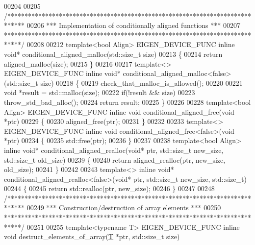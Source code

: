 \begin{DoxyCode}
00204 
00205 \textcolor{comment}{/*****************************************************************************}
00206 \textcolor{comment}{*** Implementation of conditionally aligned functions                      ***}
00207 \textcolor{comment}{*****************************************************************************/}
00208 
00212 \textcolor{keyword}{template}<\textcolor{keywordtype}{bool} Align> EIGEN\_DEVICE\_FUNC \textcolor{keyword}{inline} \textcolor{keywordtype}{void}* conditional\_aligned\_malloc(std::size\_t size)
00213 \{
00214   \textcolor{keywordflow}{return} aligned\_malloc(size);
00215 \}
00216 
00217 \textcolor{keyword}{template}<> EIGEN\_DEVICE\_FUNC \textcolor{keyword}{inline} \textcolor{keywordtype}{void}* conditional\_aligned\_malloc<false>(std::size\_t size)
00218 \{
00219   check\_that\_malloc\_is\_allowed();
00220 
00221   \textcolor{keywordtype}{void} *result = std::malloc(size);
00222   \textcolor{keywordflow}{if}(!result && size)
00223     throw\_std\_bad\_alloc();
00224   \textcolor{keywordflow}{return} result;
00225 \}
00226 
00228 \textcolor{keyword}{template}<\textcolor{keywordtype}{bool} Align> EIGEN\_DEVICE\_FUNC \textcolor{keyword}{inline} \textcolor{keywordtype}{void} conditional\_aligned\_free(\textcolor{keywordtype}{void} *ptr)
00229 \{
00230   aligned\_free(ptr);
00231 \}
00232 
00233 \textcolor{keyword}{template}<> EIGEN\_DEVICE\_FUNC \textcolor{keyword}{inline} \textcolor{keywordtype}{void} conditional\_aligned\_free<false>(\textcolor{keywordtype}{void} *ptr)
00234 \{
00235   std::free(ptr);
00236 \}
00237 
00238 \textcolor{keyword}{template}<\textcolor{keywordtype}{bool} Align> \textcolor{keyword}{inline} \textcolor{keywordtype}{void}* conditional\_aligned\_realloc(\textcolor{keywordtype}{void}* ptr, std::size\_t new\_size, std::size\_t 
      old\_size)
00239 \{
00240   \textcolor{keywordflow}{return} aligned\_realloc(ptr, new\_size, old\_size);
00241 \}
00242 
00243 \textcolor{keyword}{template}<> \textcolor{keyword}{inline} \textcolor{keywordtype}{void}* conditional\_aligned\_realloc<false>(\textcolor{keywordtype}{void}* ptr, std::size\_t new\_size, std::size\_t)
00244 \{
00245   \textcolor{keywordflow}{return} std::realloc(ptr, new\_size);
00246 \}
00247 
00248 \textcolor{comment}{/*****************************************************************************}
00249 \textcolor{comment}{*** Construction/destruction of array elements                             ***}
00250 \textcolor{comment}{*****************************************************************************/}
00251 
00255 \textcolor{keyword}{template}<\textcolor{keyword}{typename} T> EIGEN\_DEVICE\_FUNC \textcolor{keyword}{inline} \textcolor{keywordtype}{void} destruct\_elements\_of\_array(\hyperlink{group___sparse_core___module_class_eigen_1_1_triplet}{T} *ptr, std::size\_t size)

\end{DoxyCode}

